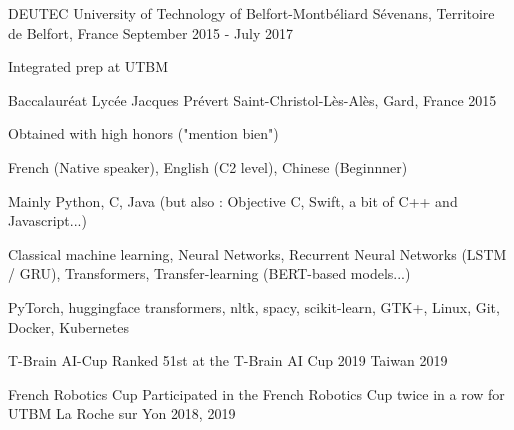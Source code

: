 \documentclass[11pt, a4paper]{awesome-cv}
\begin{document}
\begin{cventries}
  \cventry
  {DEUTEC}
  {University of Technology of Belfort-Montbéliard}
  {Sévenans, Territoire de Belfort, France}
  {September 2015 - July 2017}
  {
    \begin{cvitems}
      \item Integrated prep at UTBM
    \end{cvitems}
  }

  \cventry
  {Baccalauréat}
  {Lycée Jacques Prévert}
  {Saint-Christol-Lès-Alès, Gard, France}
  {2015}
  {
    \begin{cvitems}
      \item Obtained with high honors ("mention bien")
    \end{cvitems}
  }

\end{cventries}



\begin{cvskills}
  {French (Native speaker), English (C2 level), Chinese (Beginnner)}
  
  {Mainly Python, C, Java (but also : Objective C, Swift, a bit of C++ and Javascript...)}

  {Classical machine learning, Neural Networks, Recurrent Neural Networks (LSTM / GRU), Transformers, Transfer-learning (BERT-based models...)}

  {PyTorch, huggingface transformers, nltk, spacy, scikit-learn, GTK+, Linux, Git, Docker, Kubernetes}
\end{cvskills}



\begin{cvhonors}
  \cvhonor
  {T-Brain AI-Cup}
  {Ranked 51st at the T-Brain AI Cup 2019}
  {Taiwan}
  {2019}
  
  \cvhonor
  {French Robotics Cup}
  {Participated in the French Robotics Cup twice in a row for UTBM}
  {La Roche sur Yon}
  {2018, 2019}
\end{cvhonors}


\end{document}
